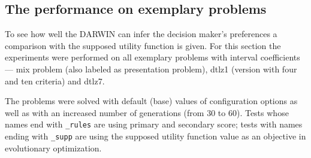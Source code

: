 \subsection{The performance on exemplary problems}
To see how well the DARWIN can infer the decision maker's preferences a
comparison with the supposed utility function is given. For this section the
experiments were performed on all exemplary problems with interval
coefficients --- mix problem (also labeled as presentation problem), dtlz1
(version with four and ten criteria) and dtlz7.

The problems were solved with default (base) values of configuration options
as well as with an increased number of generations (from $30$ to $60$). Tests
whose names end with \texttt{\_rules} are using primary and secondary score;
tests with names ending with \texttt{\_supp} are using the supposed utility
function value as an objective in evolutionary optimization.

